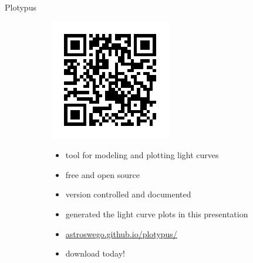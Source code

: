\documentclass{beamer}
\begin{document}
\begin{frame}{Plotypus}
\begin{figure}
\begin{subfigure}[c]{0.2\textwidth}
    \includegraphics[width=\textwidth]{img/plotypus-qr}
  \end{subfigure}
  \begin{subfigure}[c]{0.7\textwidth}
    \begin{itemize}
      \item tool for modeling and plotting light curves
      \item free and open source
      \item version controlled and documented
      \item generated the light curve plots in this presentation
      \item \href{https://astroswego.github.io/plotypus/}
                 {astroswego.github.io/plotypus/}
      \item download today!
    \end{itemize}
  \end{subfigure}

  \textcite{plotypus2015}
\end{figure}
\end{frame}
\end{document}

